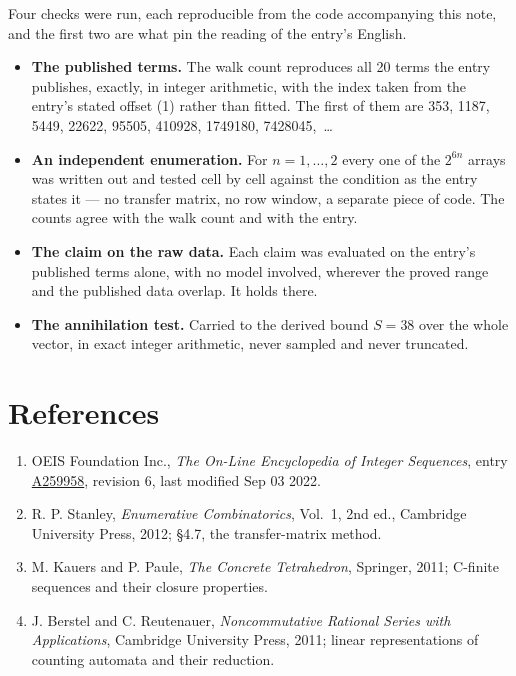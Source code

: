 \documentclass[11pt]{article}
\theoremstyle{definition}
\begin{document}
Four checks were run, each reproducible from the code accompanying this note, and the first two are what pin the reading of the entry's English.

\begin{itemize}

\item {\bfseries The published terms.} The walk count reproduces all 20 terms the entry publishes, exactly, in integer arithmetic, with the index taken from the entry's stated offset (1) rather than fitted. The first of them are 353, 1187, 5449, 22622, 95505, 410928, 1749180, 7428045,~\dots

\item {\bfseries An independent enumeration.} For $n = 1,\dots,2$ every one of the $2^{6n}$ arrays was written out and tested cell by cell against the condition as the entry states it --- no transfer matrix, no row window, a separate piece of code. The counts agree with the walk count and with the entry.

\item {\bfseries The claim on the raw data.} Each claim was evaluated on the entry's published terms alone, with no model involved, wherever the proved range and the published data overlap. It holds there.

\item {\bfseries The annihilation test.} Carried to the derived bound $S = 38$ over the whole vector, in exact integer arithmetic, never sampled and never truncated.

\end{itemize}

\section{References}

\begin{enumerate}

\item OEIS Foundation Inc., \emph{The On-Line Encyclopedia of Integer Sequences}, entry \href{https://oeis.org/A259958}{A259958}, revision 6, last modified Sep 03 2022.

\item R. P. Stanley, \emph{Enumerative Combinatorics}, Vol.~1, 2nd ed., Cambridge University Press, 2012; \S4.7, the transfer-matrix method.

\item M. Kauers and P. Paule, \emph{The Concrete Tetrahedron}, Springer, 2011; C-finite sequences and their closure properties.

\item J. Berstel and C. Reutenauer, \emph{Noncommutative Rational Series with Applications}, Cambridge University Press, 2011; linear representations of counting automata and their reduction.

\end{enumerate}
\end{document}
